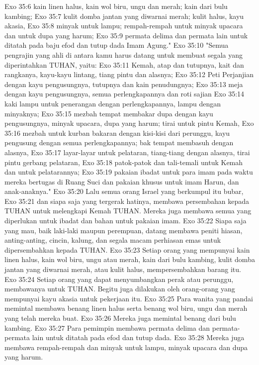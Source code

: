 Exo 35:6  kain linen halus, kain wol biru, ungu dan merah; kain dari bulu kambing;
Exo 35:7  kulit domba jantan yang diwarnai merah; kulit halus, kayu akasia,
Exo 35:8  minyak untuk lampu; rempah-rempah untuk minyak upacara dan untuk dupa yang harum;
Exo 35:9  permata delima dan permata lain untuk ditatah pada baju efod dan tutup dada Imam Agung."
Exo 35:10  "Semua pengrajin yang ahli di antara kamu harus datang untuk membuat segala yang diperintahkan TUHAN, yaitu:
Exo 35:11  Kemah, atap dan tutupnya, kait dan rangkanya, kayu-kayu lintang, tiang pintu dan alasnya;
Exo 35:12  Peti Perjanjian dengan kayu pengusungnya, tutupnya dan kain penudungnya;
Exo 35:13  meja dengan kayu pengusungnya, semua perlengkapannya dan roti sajian
Exo 35:14  kaki lampu untuk penerangan dengan perlengkapannya, lampu dengan minyaknya;
Exo 35:15  mezbah tempat membakar dupa dengan kayu pengusungnya, minyak upacara, dupa yang harum; tirai untuk pintu Kemah,
Exo 35:16  mezbah untuk kurban bakaran dengan kisi-kisi dari perunggu, kayu pengusung dengan semua perlengkapannya; bak tempat membasuh dengan alasnya,
Exo 35:17  layar-layar untuk pelataran, tiang-tiang dengan alasnya, tirai pintu gerbang pelataran,
Exo 35:18  patok-patok dan tali-temali untuk Kemah dan untuk pelatarannya;
Exo 35:19  pakaian ibadat untuk para imam pada waktu mereka bertugas di Ruang Suci dan pakaian khusus untuk imam Harun, dan anak-anaknya."
Exo 35:20  Lalu semua orang Israel yang berkumpul itu bubar,
Exo 35:21  dan siapa saja yang tergerak hatinya, membawa persembahan kepada TUHAN untuk melengkapi Kemah TUHAN. Mereka juga membawa semua yang diperlukan untuk ibadat dan bahan untuk pakaian imam.
Exo 35:22  Siapa saja yang mau, baik laki-laki maupun perempuan, datang membawa peniti hiasan, anting-anting, cincin, kalung, dan segala macam perhiasan emas untuk dipersembahkan kepada TUHAN.
Exo 35:23  Setiap orang yang mempunyai kain linen halus, kain wol biru, ungu atau merah, kain dari bulu kambing, kulit domba jantan yang diwarnai merah, atau kulit halus, mempersembahkan barang itu.
Exo 35:24  Setiap orang yang dapat menyumbangkan perak atau perunggu, membawanya untuk TUHAN. Begitu juga dilakukan oleh orang-orang yang mempunyai kayu akasia untuk pekerjaan itu.
Exo 35:25  Para wanita yang pandai memintal membawa benang linen halus serta benang wol biru, ungu dan merah yang telah mereka buat.
Exo 35:26  Mereka juga memintal benang dari bulu kambing.
Exo 35:27  Para pemimpin membawa permata delima dan permata-permata lain untuk ditatah pada efod dan tutup dada.
Exo 35:28  Mereka juga membawa rempah-rempah dan minyak untuk lampu, minyak upacara dan dupa yang harum.
